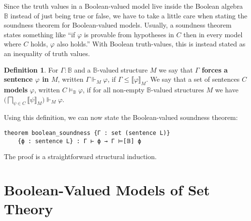 \documentclass[sigplan,screen]{acmart}
\newcommand{\B}{\mathbb{B}}
\theoremstyle{definition}
\newtheorem{defn}{Definition}[section]
\begin{document}
Since the truth values in a Boolean-valued model live inside the Boolean algebra $\B$ instead of just being true or false, we have to take a little care when stating the soundness theorem for Boolean-valued models.
Usually, a soundness theorem states something like ``if $\varphi$ is provable from hypotheses in $C$ then in every model where $C$ holds, $\varphi$ also holds.''
With Boolean truth-values, this is instead stated as an inequality of truth values. %
\begin{defn}
For $\Gamma : \B$ and a $\B$-valued structure $M$ we say that
\textbf{$\Gamma$ forces a sentence $\varphi$ in $M$}, written $\Gamma \Vdash_M \varphi$, if
$\Gamma \le \llbracket \varphi \rrbracket_M$.
We say that a set of sentences $C$ \textbf{models} $\varphi$, written $C \models_{\B}\varphi$, if for all non-empty $\B$-valued structures $M$ we have $\big(\bigsqcap_{\psi\in C}\big \llbracket \psi \rrbracket_M)\Vdash_M \varphi$.
\end{defn}
Using this definition, we can now state the Boolean-valued soundness theorem: \label{boolean-soundness}
\begin{lstlisting}
theorem boolean_soundness {Γ : set (sentence L)}
    {ϕ : sentence L} : Γ ⊢ ϕ → Γ ⊨[𝔹] ϕ
\end{lstlisting}
The proof is a straightforward structural induction.

\section{Boolean-Valued Models of Set Theory}
\label{sect:bset}
\end{document}
